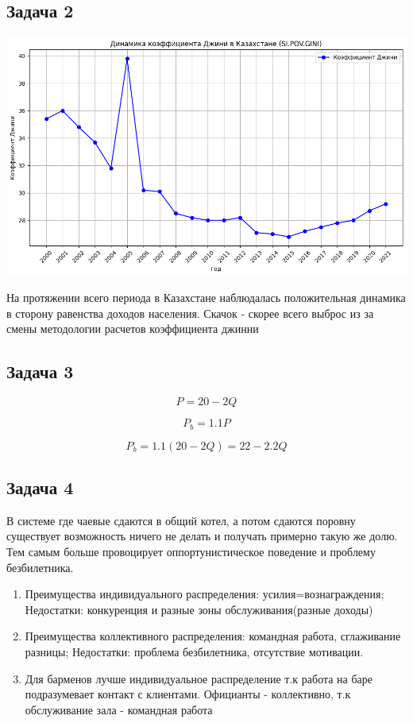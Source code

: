 \documentclass[a4paper,12pt]{article}
\begin{document}
\subsection{Задача 2}
\includegraphics[scale=0.6]{graphs/3.5.png}

На протяжении всего периода в Казахстане наблюдалась положительная динамика в сторону равенства доходов населения. Скачок - скорее всего выброс из за смены методологии расчетов коэффициента джинни

\subsection{Задача 3}
\[
P=20-2Q
\]

\[
P_b = 1.1P
\]

\[
P_b=1.1(20-2Q) = 22-2.2Q
\]

\subsection{Задача 4}
В системе где чаевые сдаются в общий котел, а потом сдаются поровну существует возможность ничего не делать и получать примерно такую же долю. Тем самым больше провоцирует оппортунистическое поведение и проблему безбилетника.

\begin{enumerate}
    \item Преимущества индивидуального распределения: усилия=вознаграждения; Недостатки: конкуренция и разные зоны обслуживания(разные доходы)
    \item Преимущества коллективного распределения: командная работа, сглаживание разницы; Недостатки: проблема безбилетника, отсутствие мотивации.
    \item Для барменов лучше индивидуальное распределение т.к работа на баре подразумевает контакт с клиентами. Официанты - коллективно, т.к обслуживание зала - командная работа
\end{enumerate}
\end{document}
